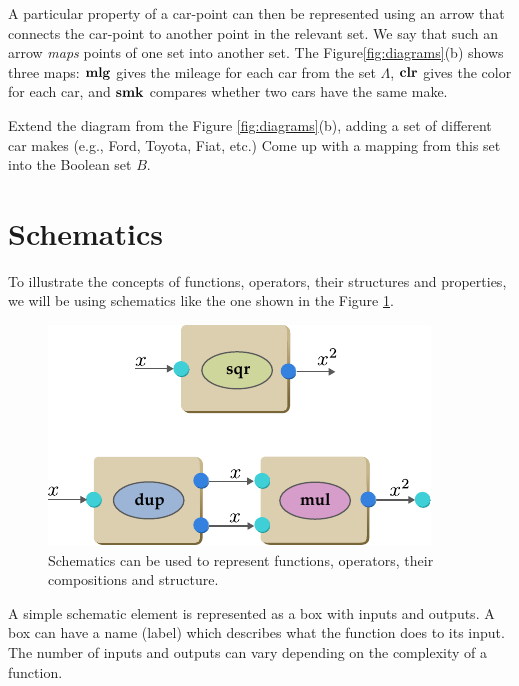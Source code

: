 A particular property of a car-point
can then be represented using an arrow that connects the car-point to
another point in the relevant set. We say that such an arrow \emph{maps}
points of one set into another set. The Figure\ref{fig:diagrams}(b)
shows three maps: $\textrm{\bf mlg}$ gives the mileage for each car from the
set $\Lambda$, $\textrm{\bf clr}$ gives the color for each car, and
$\textrm{\bf smk}$ compares whether two cars have the same make.

\begin{exercise}
Extend the diagram from the Figure \ref{fig:diagrams}(b), adding a set
of different car makes (e.g., Ford, Toyota, Fiat, etc.) Come up with a
mapping from this set into the Boolean set $B$.
\label{exe:carMakesSet}
\end{exercise}

\section{Schematics}
To illustrate the concepts of functions, operators, their structures and
properties, we will be using schematics like the one
shown in the Figure \ref{fig:schematicExample}.
\begin{figure}%
  \includegraphics[scale=1.0]{../01Introduction/pics/schematicExample}
  \caption{Schematics can be used to represent functions, operators,
    their compositions and structure.}
  \label{fig:schematicExample}
\end{figure}

A simple schematic element is represented as a box with inputs
and outputs. A box can have a name (label) which describes what the
function does to its input.  The number of inputs and
outputs can vary depending on the complexity of a function.

